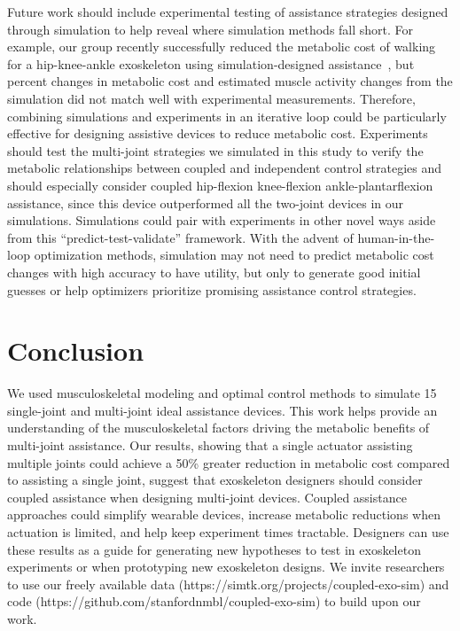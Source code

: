 \documentclass[10pt,letterpaper]{article}
\begin{document}
Future work should include experimental testing of assistance strategies designed through simulation to help reveal where simulation methods fall short. For example, our group recently successfully reduced the metabolic cost of walking for a hip-knee-ankle exoskeleton using simulation-designed assistance~\cite{Franks:2020}, but percent changes in metabolic cost and estimated muscle activity changes from the simulation did not match well with experimental measurements. Therefore, combining simulations and experiments in an iterative loop could be particularly effective for designing assistive devices to reduce metabolic cost. Experiments should test the multi-joint strategies we simulated in this study to verify the metabolic relationships between coupled and independent control strategies and should especially consider coupled hip-flexion knee-flexion ankle-plantarflexion assistance, since this device outperformed all the two-joint devices in our simulations. Simulations could pair with experiments in other novel ways aside from this ``predict-test-validate'' framework. With the advent of human-in-the-loop optimization methods, simulation may not need to predict metabolic cost changes with high accuracy to have utility, but only to generate good initial guesses or help optimizers prioritize promising assistance control strategies.

\section*{Conclusion}
We used musculoskeletal modeling and optimal control methods to simulate 15 single-joint and multi-joint ideal assistance devices. This work helps provide an understanding of the musculoskeletal factors driving the metabolic benefits of multi-joint assistance. Our results, showing that a single actuator assisting multiple joints could achieve a 50\% greater reduction in metabolic cost compared to assisting a single joint, suggest that exoskeleton designers should consider coupled assistance when designing multi-joint devices. Coupled assistance approaches could simplify wearable devices, increase metabolic reductions when actuation is limited, and help keep experiment times tractable. Designers can use these results as a guide for generating new hypotheses to test in exoskeleton experiments or when prototyping new exoskeleton designs. We invite researchers to use our freely available data (https://simtk.org/projects/coupled-exo-sim) and code (https://github.com/stanfordnmbl/coupled-exo-sim) to build upon our work.
\end{document}
